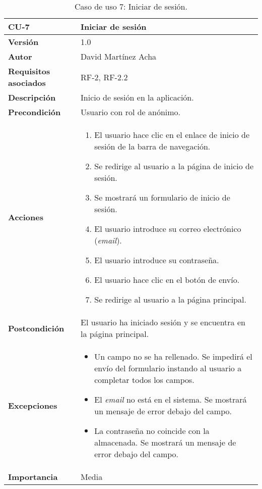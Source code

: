 \begin{table}[p]
	\centering
	\begin{tabularx}{\linewidth}{ p{} p{} }
		\toprule
		\textbf{CU-7}    & \textbf{Iniciar de sesión}\\
		\toprule
		\textbf{Versión}              & 1.0    \\
		\textbf{Autor}                & David Martínez Acha \\
		\textbf{Requisitos asociados} & RF-2, RF-2.2 \\
		\textbf{Descripción}          & Inicio de sesión en la aplicación. \\
		\textbf{Precondición}         & Usuario con rol de anónimo. \\
		\textbf{Acciones}             &
		\begin{enumerate}
			\def\labelenumi{\arabic{enumi}.}
			\tightlist
			\item El usuario hace clic en el enlace de inicio de sesión de la barra de navegación.
			\item Se redirige al usuario a la página de inicio de sesión.
			\item Se mostrará un formulario de inicio de sesión.
			\item El usuario introduce su correo electrónico (\textit{email}).
			\item El usuario introduce su contraseña.
            \item El usuario hace clic en el botón de envío.
			\item Se redirige al usuario a la página principal.
		\end{enumerate}\\
		\textbf{Postcondición}        & El usuario ha iniciado sesión y se encuentra en la página principal. \\
		\textbf{Excepciones}          & \begin{itemize}
			\item Un campo no se ha rellenado. Se impedirá el envío del formulario instando al usuario a completar todos los campos.
			\item El \emph{email} no está en el sistema. Se mostrará un mensaje de error debajo del campo.
			\item La contraseña no coincide con la almacenada. Se mostrará un mensaje de error debajo del campo.
		\end{itemize}\\
		\textbf{Importancia}          & Media \\
		\bottomrule
	\end{tabularx}
	\caption{Caso de uso 7: Iniciar de sesión.}
\end{table}

